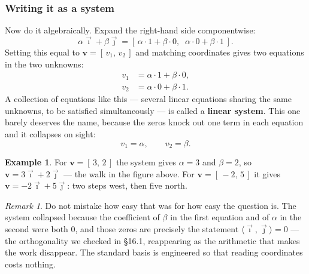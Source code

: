 \documentclass[11pt]{article}
\theoremstyle{definition}
\newtheorem{ex}{Example}[section]
\theoremstyle{remark}
\newtheorem*{rmk}{Remark}
\newcommand{\vc}[1]{\mathbf{#1}}
\newcommand{\ivec}{\vec{\imath}}
\newcommand{\jvec}{\vec{\jmath}}
\newcommand{\lattice}[4]{%
  \draw[step=1cm,gray!25,very thin] (#1,#3) grid (#2,#4);
  \draw[axisline] (#1,0) -- (#2+0.45,0) node[right,font=\scriptsize,black]{$x$};
  \draw[axisline] (0,#3) -- (0,#4+0.45) node[above,font=\scriptsize,black]{$y$};
}
\begin{document}
\begin{center}
\end{center}

\subsubsection*{Writing it as a system}
Now do it algebraically. Expand the right-hand side componentwise:
\[
  \alpha\ivec + \beta\jvec
  = [\,\alpha\cdot 1 + \beta\cdot 0,\;\; \alpha\cdot 0 + \beta\cdot 1\,] .
\]
Setting this equal to $\vc{v}=[\,v_1,\,v_2\,]$ and matching coordinates gives
two equations in the two unknowns:
\[
  \begin{aligned}
    v_1 &= \alpha\cdot 1 + \beta\cdot 0, \\
    v_2 &= \alpha\cdot 0 + \beta\cdot 1 .
  \end{aligned}
\]
A collection of equations like this --- several linear equations sharing the
same unknowns, to be satisfied simultaneously --- is called a \textbf{linear
system}. This one barely deserves the name, because the zeros knock out one term
in each equation and it collapses on sight:
\[
  v_1 = \alpha,
  \qquad
  v_2 = \beta .
\]

\begin{ex}
For $\vc{v}=[\,3,\,2\,]$ the system gives $\alpha=3$ and $\beta=2$, so
$\vc{v}=3\ivec+2\jvec$ --- the walk in the figure above. For
$\vc{v}=[\,-2,\,5\,]$ it gives $\vc{v}=-2\ivec+5\jvec$: two steps west, then
five north.
\end{ex}

\begin{rmk}
Do not mistake how easy that was for how easy the question is. The system
collapsed because the coefficient of $\beta$ in the first equation and of
$\alpha$ in the second were both $0$, and those zeros are precisely the
statement $\langle\ivec,\jvec\rangle=0$ --- the orthogonality we checked in
\S16.1, reappearing as the arithmetic that makes the work disappear. The
standard basis is engineered so that reading coordinates costs nothing.
\end{rmk}
\end{document}
